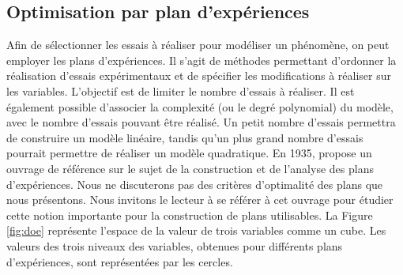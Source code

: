 \subsection{Optimisation par plan d'expériences} \label{subsec:doe}
Afin de sélectionner les essais à réaliser pour modéliser un phénomène, on peut employer les plans d'expériences.
Il s'agit de méthodes permettant d'ordonner la réalisation d'essais expérimentaux et de spécifier les modifications à réaliser sur les variables.
L'objectif est de limiter le nombre d'essais à réaliser.
Il est également possible d'associer la complexité (ou le degré polynomial) du modèle, avec le nombre d'essais pouvant être réalisé.
Un petit nombre d'essais permettra de construire un modèle linéaire, tandis qu'un plus grand nombre d'essais pourrait permettre de réaliser un modèle quadratique.
En 1935, \cite{fisher_design_1974} propose un ouvrage de référence sur le sujet de la construction et de l'analyse des plans d'expériences.
Nous ne discuterons pas des critères d'optimalité des plans que nous présentons. Nous invitons le lecteur à se référer à cet ouvrage pour étudier cette notion importante pour la construction de plans utilisables.
La Figure \ref{fig:doe} représente l'espace de la valeur de trois variables comme un cube.
Les valeurs des trois niveaux des variables, obtenues pour différents plans d'expériences, sont représentées par les cercles.

